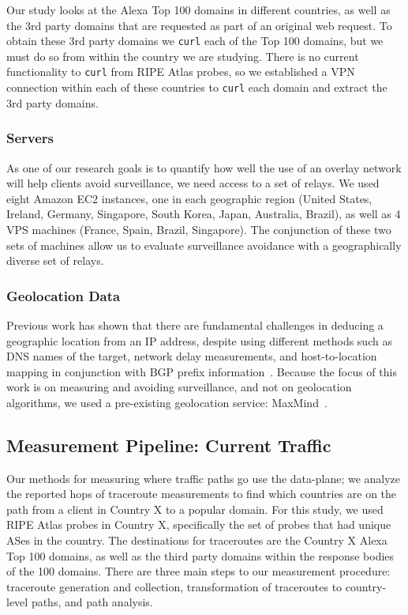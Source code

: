 Our study looks at the Alexa Top 100 domains in different countries, as well as the 3rd party domains that are requested as part of an original web request.  To obtain these 3rd party domains we {\tt curl} each of the Top 100 domains, but we must do so from within the country we are studying.  There is no current functionality to {\tt curl} from RIPE Atlas probes, so we established a VPN connection within each of these countries to {\tt curl} each domain and extract the 3rd party domains.

\subsubsection{Servers}
As one of our research goals is to quantify how well the use of an overlay network will help clients avoid surveillance, we need access to a set of relays.  We used eight Amazon EC2 instances, one in each geographic region (United States, Ireland, Germany, Singapore, South Korea, Japan, Australia, Brazil), as well as 4 VPS machines (France, Spain, Brazil, Singapore).  The conjunction of these two sets of machines allow us to evaluate surveillance avoidance with a geographically diverse set of relays.

\subsubsection{Geolocation Data}
Previous work has shown that there are fundamental challenges in deducing a geographic location from an IP address, despite using different methods such as DNS names of the target, network delay measurements, and host-to-location mapping in conjunction with BGP prefix information~\cite{padmanabhan2001investigation}.  Because the focus of this work is on measuring and avoiding surveillance, and not on geolocation algorithms, we used a pre-existing geolocation service: MaxMind~\cite{maxmind}.

\subsection{Measurement Pipeline: Current Traffic}
\label{pipeline1}
Our methods for measuring where traffic paths go use the data-plane; we analyze the reported hops of traceroute measurements to find which countries are on the path from a client in Country X to a popular domain.  For this study, we used RIPE Atlas probes in Country X, specifically the set of probes that had unique ASes in the country.  The destinations for traceroutes are the Country X Alexa Top 100 domains, as well as the third party domains within the response bodies of the 100 domains.  There are three main steps to our measurement procedure: traceroute generation and collection, transformation of traceroutes to country-level paths, and path analysis.

